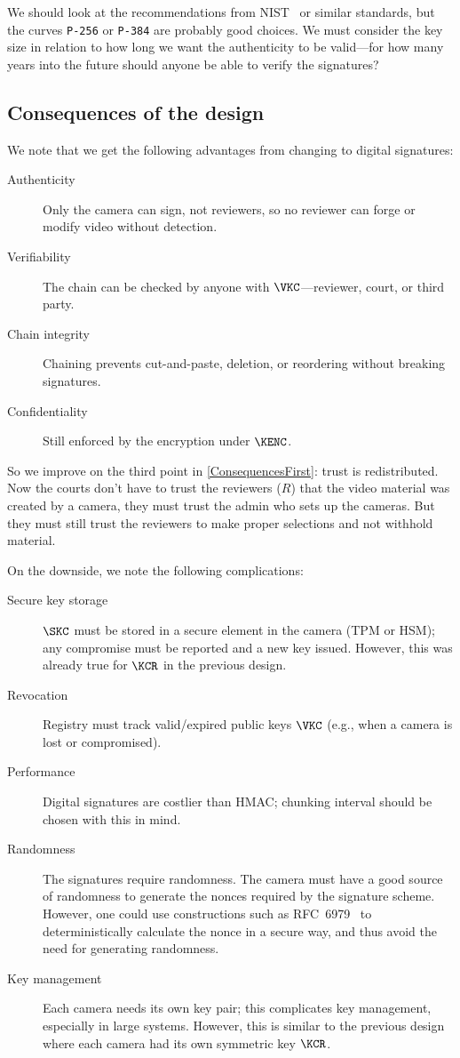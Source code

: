 We should look at the recommendations from NIST~\autocite{SP80057} or
similar standards, but the curves \texttt{P-256} or \texttt{P-384} are
probably good choices.
We must consider the key size in relation to how long we want the authenticity 
to be valid---for how many years into the future should anyone be able to 
verify the signatures?

\subsection{Consequences of the design}

We note that we get the following advantages from changing to digital 
signatures:
\begin{description}
    \item[Authenticity] Only the camera can sign, not reviewers, so no reviewer 
      can forge or modify video without detection.
    \item[Verifiability] The chain can be checked by anyone with 
      \(\VKC\)---reviewer, court, or third party.
    \item[Chain integrity] Chaining prevents cut-and-paste, deletion, or 
      reordering without breaking signatures.
    \item[Confidentiality] Still enforced by the encryption under \(\KENC\).
\end{description}

So we improve on the third point in \cref{ConsequencesFirst}: trust is 
redistributed.
Now the courts don't have to trust the reviewers (\(R\)) that the video 
material was created by a camera, they must trust the admin who sets up the 
cameras.
But they must still trust the reviewers to make proper selections and not 
withhold material.

On the downside, we note the following complications:
\begin{description}
  \item[Secure key storage] \(\SKC\) must be stored in a secure element in the 
    camera (\eg \ac{TPM} or HSM); any compromise must be reported and a new
    key issued.
    However, this was already true for \(\KCR\) in the previous design.
  \item[Revocation] Registry must track valid/expired public keys \(\VKC\) 
    (e.g., when a camera is lost or compromised).
  \item[Performance] Digital signatures are costlier than HMAC; chunking 
    interval should be chosen with this in mind.
  \item[Randomness] The signatures require randomness.
    The camera must have a good source of randomness to generate the nonces 
    required by the signature scheme.
    However, one could use constructions such as
    RFC~6979~\autocite{RFC6979} to deterministically calculate the nonce
    in a secure way, and thus avoid the need for generating randomness.
  \item[Key management] Each camera needs its own key pair; this complicates 
    key management, especially in large systems.
    However, this is similar to the previous design where each camera had its 
    own symmetric key \(\KCR\).
\end{description}

